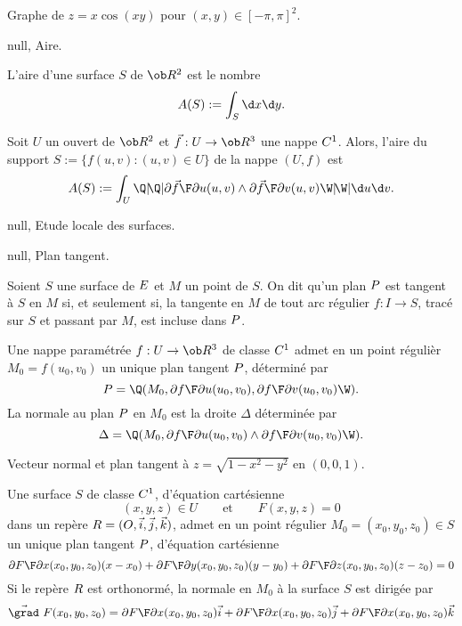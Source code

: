 \centerline{%
}%
\Figure [Index=Surfaces!Representation Cartesienne@Repr\'esentation Cart\'esienne] Graphe de $z=x\cos(xy)$ pour $(x,y)\in[-\pi,\pi]^2$.

\Subsection null, Aire.
\bigskip

 L'aire d'une surface $S$ de $\ob R^2$ 
est le nombre
$$
\sc A(S):=\int_S\d x\d y. 
$$

 Soit $U$ un ouvert de $\ob R^2$ et 
$\vec f:U\to\ob R^3$ 
une nappe $\sc C^1$. Alors, l'aire du support $S:=\{f(u,v):(u,v)\in U\}$ 
de la nappe $(U,f)$ est 
$$
\sc A(S):=\int_U\Q|\!\Q|{\partial \vec f\F\partial u}(u,v)\wedge{\partial\vec f\F\partial v}(u,v)\W|\!\W|\d u\d v. 
$$
\smallskip

\Section null, Etude locale des surfaces.

\Subsection null, Plan tangent.
\bigskip

\Definition [] Soient $S$ une surface de $\sc E$ et $M$ un point de $S$. \pn
On dit qu'un plan $\sc P$ est tangent \`a $S$ en $M$ si, et seulement si, 
la tangente en $M$ de tout arc r\'egulier $f:I\to S$, trac\'e sur $S$ 
et passant par $M$, est incluse dans $\sc P$. 
\bigskip

\Theoreme [] Une nappe param\'etr\'ee $f:U\to\ob R^3$ de classe $\sc C^1$ admet 
en un point r\'eguli\`er $M_0=f(u_0,v_0)$ un unique plan tangent $\sc P$, 
d\'etermin\'e par 
$$
\sc P=\Q(M_0,{\partial f\F\partial u}(u_0,v_0),{\partial f\F\partial v}(u_0,v_0)\W).
$$
La normale au plan $\sc P$ en $M_0$ est la droite $\Delta$ d\'etermin\'ee par 
$$
\Delta=\Q(M_0,{\partial f\F\partial u}(u_0,v_0)\wedge{\partial f\F\partial v}(u_0,v_0)\W).
$$


\centerline{%
}%
\Figure [Index=Surfaces!Plant tangent]  Vecteur normal et plan tangent \`a $z=\sqrt{1-x^2-y^2}$ en $(0,0,1)$.
\bigskip

\Theoreme [] Une surface $S$ de classe $\sc C^1$, d'\'equation cart\'esienne 
$$
(x,y,z)\in U\qquad\mbox{et}\qquad F(x,y,z)=0
$$
dans un rep\`ere $\sc R=(O,\vec i,\vec j,\vec k)$, 
admet en un point r\'egulier $M_0=(x_0,y_0,z_0)\in S$ un unique plan tangent $\sc P$, 
d'\'equation cart\'esienne 
$$
{\partial F\F\partial x}(x_0,y_0,z_0)(x-x_0)+{\partial F\F\partial y}(x_0,y_0,z_0)(y-y_0)
+{\partial F\F\partial z}(x_0,y_0,z_0)(z-z_0)=0
$$
Si le rep\`ere $\sc R$ est orthonorm\'e, la normale en $M_0$ \`a la surface $S$ 
est dirig\'ee par
$$
\vec{\grad}\ F(x_0,y_0,z_0)={\partial F\F\partial x}(x_0,y_0,z_0)\vec i+{\partial F\F\partial x}(x_0,y_0,z_0)\vec j
+{\partial F\F\partial x}(x_0,y_0,z_0)\vec k
$$ 
\medskip

